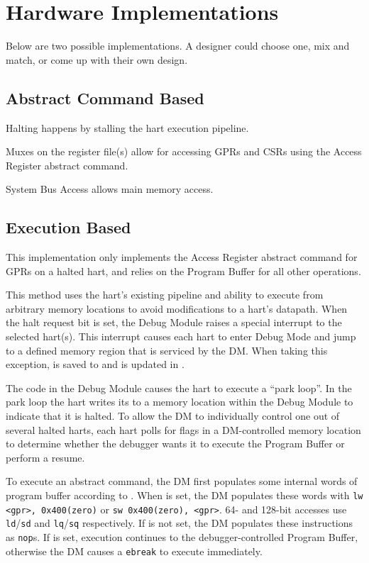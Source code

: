 \chapter{Hardware Implementations}
\label{sec:implementations}

Below are two possible implementations. A designer could choose one, mix and
match, or come up with their own design.

\section{Abstract Command Based}

Halting happens by stalling the hart execution pipeline.

Muxes on the register file(s) allow for accessing GPRs and CSRs
using the Access Register abstract command.

System Bus Access allows main memory access.

\section{Execution Based}

This implementation only implements the Access Register abstract command
for GPRs on a halted hart, and relies on the Program Buffer for all other
operations.

This method uses the hart's existing pipeline
and ability to execute from arbitrary memory locations to avoid
modifications to a hart's datapath.
When the halt request bit is set, the Debug Module raises a special interrupt
to the selected hart(s). This interrupt causes each
hart to enter Debug Mode and jump to a defined
memory region that is serviced by the DM.
When taking this exception, \Rpc is saved to \Rdpc and \Fcause is updated
in \Rdcsr.

The code in the Debug Module causes the hart to execute a ``park loop''.
In the park loop the hart writes its \Rmhartid to a
memory location within the Debug Module to indicate that it is halted.
To allow the DM to individually control one out of several
halted harts, each hart polls for flags in a DM-controlled memory location
to determine whether the debugger wants it to
execute the Program Buffer or perform a resume.

To execute an abstract command, the DM first populates some internal words of
program buffer according to \Rcommand. When \Ftransfer is set, the DM
populates these words with {\tt lw <gpr>, 0x400(zero)} or {\tt sw 0x400(zero), <gpr>}.
64- and 128-bit accesses use {\tt ld}/{\tt sd} and {\tt lq}/{\tt sq}
respectively. If \Ftransfer is not set, the DM populates these instructions as {\tt nop}s.
If \Fexecute is set, execution continues to the debugger-controlled Program Buffer,
otherwise the DM causes a {\tt ebreak} to execute immediately.

